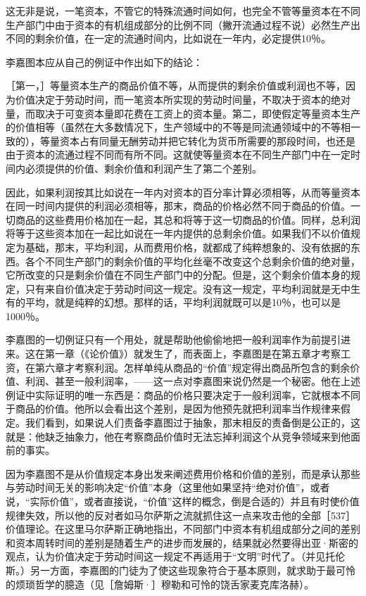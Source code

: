 这无非是说，一笔资本，不管它的特殊流通时间如何，也完全不管等量资本在不同生产部门中由于资本的有机组成部分的比例不同（撇开流通过程不说）必然生产出不同的剩余价值，在一定的流通时间内，比如说在一年内，必定提供10％。

李嘉图本应从自己的例证中作出如下的结论：

［第一，］等量资本生产的商品价值不等，从而提供的剩余价值或利润也不等，因为价值决定于劳动时间，而一笔资本所实现的劳动时间量，不取决于资本的绝对量，而取决于可变资本量即花费在工资上的资本量。第二，即使假定等量资本生产的价值相等（虽然在大多数情况下，生产领域中的不等是同流通领域中的不等相一致的），等量资本占有同量无酬劳动并把它转化为货币所需要的那段时间，也还是由于资本的流通过程不同而有所不同。这就使等量资本在不同生产部门中在一定时间内必须提供的价值、剩余价值和利润产生了第二个差别。

因此，如果利润按其比如说在一年内对资本的百分率计算必须相等，从而等量资本在同一时间内提供的利润必须相等，那末，商品的价格必然不同于商品的价值。一切商品的这些费用价格加在一起，其总和将等于这一切商品的价值。同样，总利润将等于这些资本加在一起比如说在一年内提供的总剩余价值。如果我们不以价值规定为基础，那末，平均利润，从而费用价格，就都成了纯粹想象的、没有依据的东西。各个不同生产部门的剩余价值的平均化丝毫不改变这个总剩余价值的绝对量，它所改变的只是剩余价值在不同生产部门中的分配。但是，这个剩余价值本身的规定，只有来自价值决定于劳动时间这一规定。没有这一规定，平均利润就是无中生有的平均，就是纯粹的幻想。那样的话，平均利润就既可以是10％，也可以是1000％。

李嘉图的一切例证只有一个用处，就是帮助他偷偷地把一般利润率作为前提引进来。这在第一章（《论价值》）就发生了，而表面上，李嘉图是在第五章才考察工资，在第六章才考察利润。怎样单纯从商品的“价值”规定得出商品所包含的剩余价值、利润、甚至一般利润率，——这一点对李嘉图来说仍然是一个秘密。他在上述例证中实际证明的唯一东西是：商品的价格只要决定于一般利润率，它就根本不同于商品的价值。他所以会看出这个差别，是因为他预先就把利润率当作规律来假定。我们看到，如果说人们责备李嘉图过于抽象，那末相反的责备倒是公正的，这就是：他缺乏抽象力，他在考察商品价值时无法忘掉利润这个从竞争领域来到他面前的事实。

因为李嘉图不是从价值规定本身出发来阐述费用价格和价值的差别，而是承认那些与劳动时间无关的影响决定“价值”本身（这里他如果坚持“绝对价值”，或者说，“实际价值”，或者直接说，“价值”这样的概念，倒是合适的）并且有时使价值规律失效，所以他的反对者如马尔萨斯之流就抓住这一点来攻击他的全部［537］价值理论。在这里马尔萨斯正确地指出，不同部门中资本有机组成部分之间的差别和资本周转时间的差别是随着生产的进步而发展的，结果就必然要得出亚·斯密的观点，认为价值决定于劳动时间这一规定不再适用于“文明”时代了。（并见托伦斯。）另一方面，李嘉图的门徒为了使这些现象符合于基本原则，就求助于最可怜的烦琐哲学的臆造（见［詹姆斯·］穆勒和可怜的饶舌家麦克库洛赫）。

